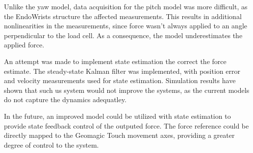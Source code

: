 Unlike the yaw model, data acquisition for the pitch model was more difficult, as the EndoWrists structure the affected measurements.
This results in additional nonlinearities in the measurements, since force wasn't always applied to an angle perpendicular to the load cell.
As a consequence, the model underestimates the applied force.

An attempt was made to implement state estimation the correct the force estimate.
The steady-state Kalman filter was implemented, with position error and velocity measurements used for state estimation.
Simulation results have shown that such us system would not improve the systems, as the current models do not capture the dynamics adequatley.

In the future, an improved model could be utilized with state estimation to provide state feedback control of the outputed force.
The force reference could be directly mapped to the Geomagic Touch movement axes, providing a greater degree of control to the system.














